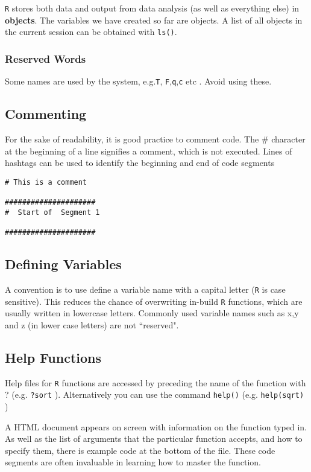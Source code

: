 \documentclass[a4paper,12pt]{article}
\begin{document}
\texttt{R} stores both data and output from data analysis (as well as everything else) in \textbf{objects}. The variables we have created so far are objects.
A list of all objects in the current session can be obtained with \texttt{ls()}.
\subsubsection{Reserved Words}

Some names are used by the system, e.g.\texttt{T}, \texttt{F},\texttt{q},\texttt{c} etc . Avoid using these.

\subsection{Commenting}
For the sake of readability, it is good practice to comment code. 
The $\#$ character at the beginning of a line signifies a comment, which is not executed. %
Lines of hashtags can be used to identify the beginning and end of code segments
\begin{verbatim}
# This is a comment

#####################
#  Start of  Segment 1

#####################
\end{verbatim}

\subsection{Defining Variables}
A convention is to use define a variable name with a capital letter (\texttt{R} is case sensitive).
This reduces the chance of overwriting in-build \texttt{R} functions, which are usually written in lowercase letters.
Commonly used variable names such as x,y and z (in lower case letters) are not ``reserved".


\subsection{Help Functions}

Help files for \texttt{R} functions are accessed by preceding the name of the function with ? (e.g. \texttt{?sort} ).
Alternatively you can use the command \texttt{help()}  (e.g. \texttt{help(sqrt)} ) 

A HTML document appears on screen with information on the function typed in. As well as the list of arguments that the particular function accepts, and how to specify them, there is example code at the bottom of the file. These code segments are often invaluable in learning how to master the function.
\end{document}
